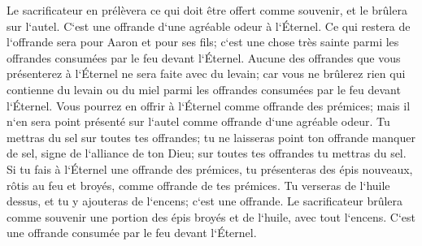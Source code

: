 \verse Le sacrificateur en prélèvera ce qui doit être offert comme souvenir, et le brûlera sur l`autel. C`est une offrande d`une agréable odeur à l`Éternel. 
\verse Ce qui restera de l`offrande sera pour Aaron et pour ses fils; c`est une chose très sainte parmi les offrandes consumées par le feu devant l`Éternel. 
\verse Aucune des offrandes que vous présenterez à l`Éternel ne sera faite avec du levain; car vous ne brûlerez rien qui contienne du levain ou du miel parmi les offrandes consumées par le feu devant l`Éternel. 
\verse Vous pourrez en offrir à l`Éternel comme offrande des prémices; mais il n`en sera point présenté sur l`autel comme offrande d`une agréable odeur. 
\verse Tu mettras du sel sur toutes tes offrandes; tu ne laisseras point ton offrande manquer de sel, signe de l`alliance de ton Dieu; sur toutes tes offrandes tu mettras du sel. 
\verse Si tu fais à l`Éternel une offrande des prémices, tu présenteras des épis nouveaux, rôtis au feu et broyés, comme offrande de tes prémices. 
\verse Tu verseras de l`huile dessus, et tu y ajouteras de l`encens; c`est une offrande. 
\verse Le sacrificateur brûlera comme souvenir une portion des épis broyés et de l`huile, avec tout l`encens. C`est une offrande consumée par le feu devant l`Éternel. 

\chapter{}

